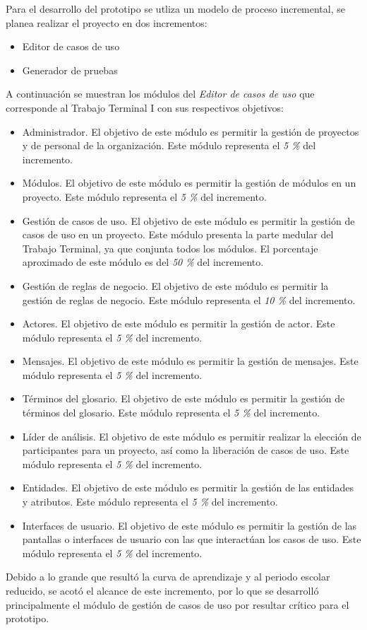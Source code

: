 Para el desarrollo del prototipo se utliza un modelo de proceso incremental, se planea realizar el proyecto en dos incrementos: 
\begin{itemize}
	\item Editor de casos de uso 
	\item Generador de pruebas
\end{itemize}

A continuación se muestran los módulos del {\it Editor de casos de uso} que corresponde al Trabajo Terminal I con sus respectivos objetivos:

\begin{itemize}
	\item Administrador. El objetivo de este módulo es permitir la gestión de proyectos y de personal de la organización. Este módulo representa el {\it 5 \%} del incremento.
	\item Módulos. El objetivo de este módulo es permitir la gestión de módulos en un proyecto. Este módulo representa el {\it 5 \%} del incremento.
	\item Gestión de casos de uso. El objetivo de este módulo es permitir la gestión de casos de uso en un proyecto. Este módulo presenta la parte medular del Trabajo Terminal, ya que conjunta todos los módulos. El porcentaje aproximado de este módulo es del {\it 50 \%} del incremento.
	\item Gestión de reglas de negocio. El objetivo de este módulo es permitir la gestión de reglas de negocio. Este módulo representa el {\it 10 \%} del incremento.
	\item Actores. El objetivo de este módulo es permitir la gestión de actor. Este módulo representa el {\it 5 \%} del incremento.
	\item Mensajes. El objetivo de este módulo es permitir la gestión de mensajes. Este módulo representa el {\it 5 \%} del incremento.
	\item Términos del glosario. El objetivo de este módulo es permitir la gestión de términos del glosario. Este módulo representa el {\it 5 \%} del incremento.
	\item Líder de análisis. El objetivo de este módulo es permitir realizar la elección de participantes para un proyecto, así como la liberación de casos de uso. Este módulo representa el {\it 5 \%} del incremento.
	\item Entidades. El objetivo de este módulo es permitir la gestión de las entidades y atributos. Este módulo representa el {\it 5 \%} del incremento.
	\item Interfaces de usuario. El objetivo de este módulo es permitir la gestión de las pantallas o interfaces de usuario con las que interactúan los casos de uso. Este módulo representa el {\it 5 \%} del incremento.
\end{itemize}

Debido a lo grande que resultó la curva de aprendizaje y al periodo escolar reducido, se acotó el alcance de este incremento, por lo que se desarrolló principalmente el módulo de gestión de casos de uso por resultar crítico para el prototipo.

